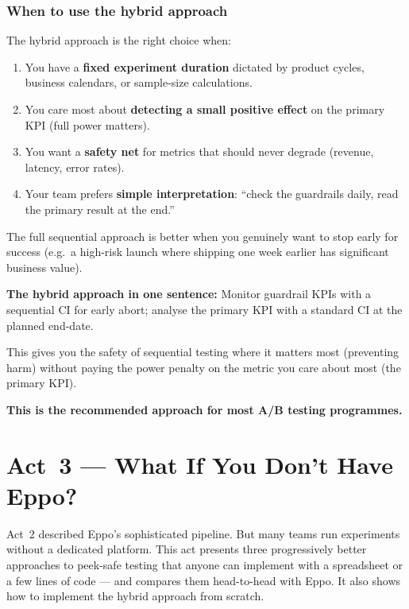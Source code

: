 \documentclass[12pt, a4paper]{article}
\begin{document}
\subsubsection*{When to use the hybrid approach}

The hybrid approach is the right choice when:
\begin{enumerate}[nosep]
  \item You have a \textbf{fixed experiment duration} dictated by product
        cycles, business calendars, or sample-size calculations.
  \item You care most about \textbf{detecting a small positive effect} on
        the primary KPI (full power matters).
  \item You want a \textbf{safety net} for metrics that should never degrade
        (revenue, latency, error rates).
  \item Your team prefers \textbf{simple interpretation}: ``check the
        guardrails daily, read the primary result at the end.''
\end{enumerate}

The full sequential approach is better when you genuinely want to stop early
for success (e.g.\ a high-risk launch where shipping one week earlier has
significant business value).

\begin{keytakeaway}
\textbf{The hybrid approach in one sentence:}
Monitor guardrail KPIs with a sequential CI for early abort; analyse the
primary KPI with a standard CI at the planned end-date.

This gives you the safety of sequential testing where it matters most
(preventing harm) without paying the power penalty on the metric you care
about most (the primary KPI).

\textbf{This is the recommended approach for most A/B testing programmes.}
\end{keytakeaway}


\newpage
\section{Act~3 --- What If You Don't Have Eppo?}

Act~2 described Eppo's sophisticated pipeline.  But many teams run experiments
without a dedicated platform.  This act presents three progressively better
approaches to peek-safe testing that anyone can implement with a spreadsheet
or a few lines of code --- and compares them head-to-head with Eppo.  It also
shows how to implement the hybrid approach from scratch.
\end{document}
